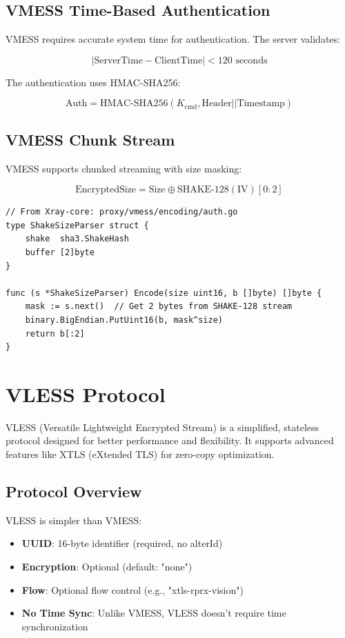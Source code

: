 \subsection{VMESS Time-Based Authentication}

VMESS requires accurate system time for authentication. The server validates:

\[
|\text{ServerTime} - \text{ClientTime}| < 120 \text{ seconds}
\]

The authentication uses HMAC-SHA256:

\[
\text{Auth} = \text{HMAC-SHA256}(K_{\text{cmd}}, \text{Header} || \text{Timestamp})
\]

\subsection{VMESS Chunk Stream}

VMESS supports chunked streaming with size masking:

\[
\text{EncryptedSize} = \text{Size} \oplus \text{SHAKE-128}(\text{IV})[0:2]
\]

\begin{verbatim}
// From Xray-core: proxy/vmess/encoding/auth.go
type ShakeSizeParser struct {
    shake  sha3.ShakeHash
    buffer [2]byte
}

func (s *ShakeSizeParser) Encode(size uint16, b []byte) []byte {
    mask := s.next()  // Get 2 bytes from SHAKE-128 stream
    binary.BigEndian.PutUint16(b, mask^size)
    return b[:2]
}
\end{verbatim}

\section{VLESS Protocol}

VLESS (Versatile Lightweight Encrypted Stream) is a simplified, stateless protocol designed for better performance and flexibility. It supports advanced features like XTLS (eXtended TLS) for zero-copy optimization.

\subsection{Protocol Overview}

VLESS is simpler than VMESS:
\begin{itemize}
    \item \textbf{UUID}: 16-byte identifier (required, no alterId)
    \item \textbf{Encryption}: Optional (default: "none")
    \item \textbf{Flow}: Optional flow control (e.g., "xtls-rprx-vision")
    \item \textbf{No Time Sync}: Unlike VMESS, VLESS doesn't require time synchronization
\end{itemize}

